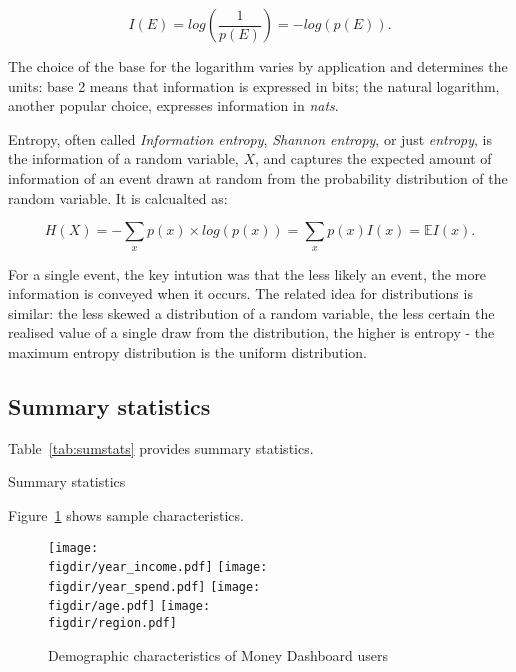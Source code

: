\begin{equation}
    I(E) = log\left(\frac{1}{p(E)}\right) = -log(p(E)).
\end{equation}

The choice of the base for the logarithm varies by application and determines
the units: base 2 means that information is expressed in bits; the natural
logarithm, another popular choice, expresses information in \textit{nats}.

Entropy, often called \textit{Information entropy}, \textit{Shannon entropy},
or just \textit{entropy}, is the information of a random variable, $X$, and
captures the expected amount of information of an event drawn at random from
the probability distribution of the random variable. It is calcualted as:

\begin{equation}
    H(X) = -\sum_x p(x) \times log(p(x)) = \sum_x p(x)I(x) = \mathbb{E} I(x).
\end{equation}

For a single event, the key intution was that the less likely an event, the
more information is conveyed when it occurs. The related idea for distributions
is similar: the less skewed a distribution of a random variable, the less
certain the realised value of a single draw from the distribution, the higher
is entropy - the maximum entropy distribution is the uniform distribution.

\subsection{Summary statistics}%
\label{par:summary_statistics}

Table~\ref{tab:sumstats} provides summary statistics.

\begin{table}[ht]
\centering\scriptsize
\caption{Summary statistics}
\label{tab:sumstats}

\end{table}


Figure~\ref{fig:sample_desc} shows sample characteristics.
\begin{figure}[ht]
    \centering
    \caption{Demographic characteristics of Money Dashboard users}
    \label{fig:sample_desc}
    \texttt{[image: \\figdir/year\_income.pdf]}
    \texttt{[image: \\figdir/year\_spend.pdf]}
    \texttt{[image: \\figdir/age.pdf]}
    \texttt{[image: \\figdir/region.pdf]}
\end{figure}


